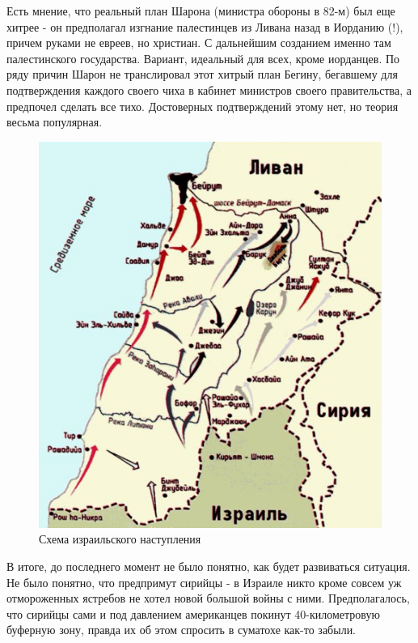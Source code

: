 Есть мнение, что реальный план Шарона (министра обороны в 82-м) был еще хитрее - он предполагал изгнание палестинцев из Ливана назад в Иорданию (!), причем руками не евреев, но христиан. С дальнейшим созданием именно там палестинского государства. Вариант, идеальный для всех, кроме иорданцев. По ряду причин Шарон не транслировал этот хитрый план Бегину, бегавшему для подтверждения каждого своего чиха в кабинет министров своего правительства, а предпочел сделать все тихо. Достоверных подтверждений этому нет, но теория весьма популярная.

\begin{figure}[h!tb] 
	\centering\includegraphics[scale=0.3]{Bekaa_2/v6Lv4fS8Wz4.jpg}
	\caption{Схема израильского наступления}%
\end{figure}

В итоге, до последнего момент не было понятно, как будет развиваться ситуация. Не было понятно, что предпримут сирийцы - в Израиле никто кроме совсем уж отмороженных ястребов не хотел новой большой войны с ними. Предполагалось, что сирийцы сами и под давлением американцев покинут 40-километровую буферную зону, правда их об этом спросить в суматохе как-то забыли.

